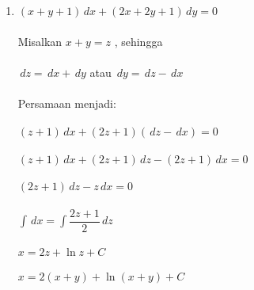 \begin{enumerate}[1.]

	\item \begin{math} (x + y + 1) \, dx + (2x + 2y + 1) \, dy = 0 \end{math} \\ \\ 
	          Misalkan \begin{math} x + y = z \end{math} , sehingga \\ \\
                    \begin{math} \, dz = \, dx + \, dy \end{math} atau \begin{math} \, dy = \, dz - \, dx \end{math} \\ \\
                     Persamaan menjadi: \\ \\
	         \begin{math} (z + 1) \, dx + (2z + 1) (\,dz - \,dx) = 0 \end{math} \\ \\
                    \begin{math} (z + 1) \, dx + (2z + 1) \, dz - (2z + 1) \, dx = 0 \end{math} \\ \\
 	         \begin{math} (2z + 1) \, dz - z \, dx = 0 \end{math} \\ \\
                    \begin{math} \int \, dx = \int \dfrac{2z+1}{2} \, dz \end{math} \\ \\
                    \begin{math} x = 2z + \ln z + C \end{math} \\ \\
	         \begin{math} x = 2 (x + y) + \ln (x+ y) + C \end{math}
		
\end{enumerate}

